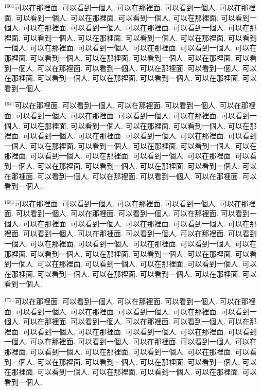 \documentclass{book}
\begin{document}
$^{1601}$可以在那裡面.
可以看到一個人.
可以在那裡面.
可以看到一個人.
可以在那裡面.
可以看到一個人.
可以在那裡面.
可以看到一個人.
可以在那裡面.
可以看到一個人.
可以在那裡面.
可以看到一個人.
可以在那裡面.
可以看到一個人.
可以在那裡面.
可以看到一個人.
可以在那裡面.
可以看到一個人.
可以在那裡面.
可以看到一個人.
可以在那裡面.
可以看到一個人.
可以在那裡面.
可以看到一個人.
可以在那裡面.
可以看到一個人.
可以在那裡面.
可以看到一個人.
可以在那裡面.
可以看到一個人.
可以在那裡面.
可以看到一個人.
可以在那裡面.
可以看到一個人.
可以在那裡面.
可以看到一個人.
可以在那裡面.
可以看到一個人.
可以在那裡面.
可以看到一個人.

$^{1641}$可以在那裡面.
可以看到一個人.
可以在那裡面.
可以看到一個人.
可以在那裡面.
可以看到一個人.
可以在那裡面.
可以看到一個人.
可以在那裡面.
可以看到一個人.
可以在那裡面.
可以看到一個人.
可以在那裡面.
可以看到一個人.
可以在那裡面.
可以看到一個人.
可以在那裡面.
可以看到一個人.
可以在那裡面.
可以看到一個人.
可以在那裡面.
可以看到一個人.
可以在那裡面.
可以看到一個人.
可以在那裡面.
可以看到一個人.
可以在那裡面.
可以看到一個人.
可以在那裡面.
可以看到一個人.
可以在那裡面.
可以看到一個人.
可以在那裡面.
可以看到一個人.
可以在那裡面.
可以看到一個人.
可以在那裡面.
可以看到一個人.
可以在那裡面.
可以看到一個人.

$^{1681}$可以在那裡面.
可以看到一個人.
可以在那裡面.
可以看到一個人.
可以在那裡面.
可以看到一個人.
可以在那裡面.
可以看到一個人.
可以在那裡面.
可以看到一個人.
可以在那裡面.
可以看到一個人.
可以在那裡面.
可以看到一個人.
可以在那裡面.
可以看到一個人.
可以在那裡面.
可以看到一個人.
可以在那裡面.
可以看到一個人.
可以在那裡面.
可以看到一個人.
可以在那裡面.
可以看到一個人.
可以在那裡面.
可以看到一個人.
可以在那裡面.
可以看到一個人.
可以在那裡面.
可以看到一個人.
可以在那裡面.
可以看到一個人.
可以在那裡面.
可以看到一個人.
可以在那裡面.
可以看到一個人.
可以在那裡面.
可以看到一個人.
可以在那裡面.
可以看到一個人.

$^{1721}$可以在那裡面.
可以看到一個人.
可以在那裡面.
可以看到一個人.
可以在那裡面.
可以看到一個人.
可以在那裡面.
可以看到一個人.
可以在那裡面.
可以看到一個人.
可以在那裡面.
可以看到一個人.
可以在那裡面.
可以看到一個人.
可以在那裡面.
可以看到一個人.
可以在那裡面.
可以看到一個人.
可以在那裡面.
可以看到一個人.
可以在那裡面.
可以看到一個人.
可以在那裡面.
可以看到一個人.
可以在那裡面.
可以看到一個人.
可以在那裡面.
可以看到一個人.
可以在那裡面.
可以看到一個人.
可以在那裡面.
可以看到一個人.
可以在那裡面.
可以看到一個人.
可以在那裡面.
可以看到一個人.
可以在那裡面.
可以看到一個人.
可以在那裡面.
可以看到一個人.
\end{document}
